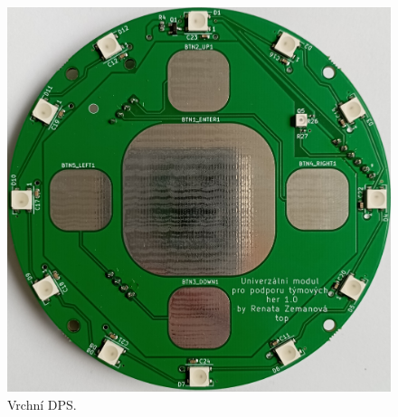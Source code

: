 \begin{figure}[!h]
	\begin{center}
	  \includegraphics[scale=0.23]{obrazky/DPS_final_vrchni.jpg}
	\end{center}
	\caption[Vrchní DPS]{Vrchní DPS.}
\end{figure}

